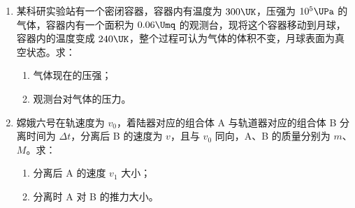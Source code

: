 \documentclass[\gkver]{gaokaozhenti}
\begin{document}
\begin{enumerate}
\item
某科研实验站有一个密闭容器，容器内有温度为 $300 \UK$，压强为 $10^{5} \UPa$ 的气体，容器内有一个面积为 $0.06 \Umq$ 的观测台，现将这个容器移动到月球，容器内的温度变成 $240 \UK$，整个过程可认为气体的体积不变，月球表面为真空状态。求：
\begin{enumerate}
	\item
	气体现在的压强；
	\item
	观测台对气体的压力。
\end{enumerate}

\item
嫦娥六号在轨速度为 $v_{0}$，着陆器对应的组合体 A 与轨道器对应的组合体 B 分离时间为 $\Delta t$，分离后 B 的速度为 $v$，且与 $v_{0}$ 同向，A、B 的质量分别为 $m$、$M$。求：
\begin{enumerate}
	\item
	分离后 A 的速度 $v_{1}$ 大小；
	\item
	分离时 A 对 B 的推力大小。
\end{enumerate}
\end{enumerate}
\end{document}
